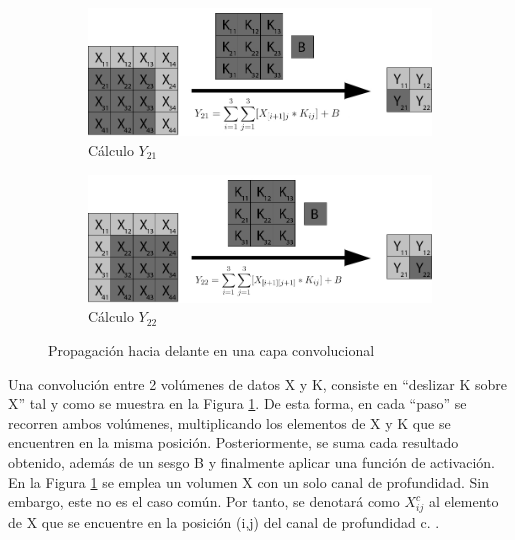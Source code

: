 \begin{figure}[H]
	\vspace{5mm}
	\begin{subfigure}{.5\textwidth}
		\hspace{-10mm}
		\includegraphics[width=1.2\linewidth]{imagenes/conv_3.jpg}  
		\caption{Cálculo $Y_{21}$}
	\end{subfigure}%
	\begin{subfigure}{.5\textwidth}
		\hspace{10mm}
		\includegraphics[width=1.2\linewidth]{imagenes/conv_4.jpg}  
		\caption{Cálculo $Y_{22}$}
	\end{subfigure}
	\caption{Propagación hacia delante en una capa convolucional}
	\label{fig:forward_prop_convolucional}
\end{figure}

Una convolución entre 2 volúmenes de datos X y K, consiste en ``deslizar K sobre X'' tal y como se muestra en la Figura \ref{fig:forward_prop_convolucional}. 
De esta forma, en cada ``paso'' se recorren ambos volúmenes, multiplicando los elementos de X y K 
que se encuentren en la misma posición. Posteriormente, se suma cada resultado obtenido, además de un sesgo B y finalmente aplicar una función de activación. \cite{capa_convolucional} \\
En la Figura \ref{fig:forward_prop_convolucional} se emplea un volumen X con un solo canal de profundidad. Sin embargo, este no es el caso común. Por tanto, se denotará como $X^{c}_{ij}$ al elemento de X que se encuentre en la posición (i,j) del canal de profundidad c. \cite{capa_convolucional_Stanford}.


